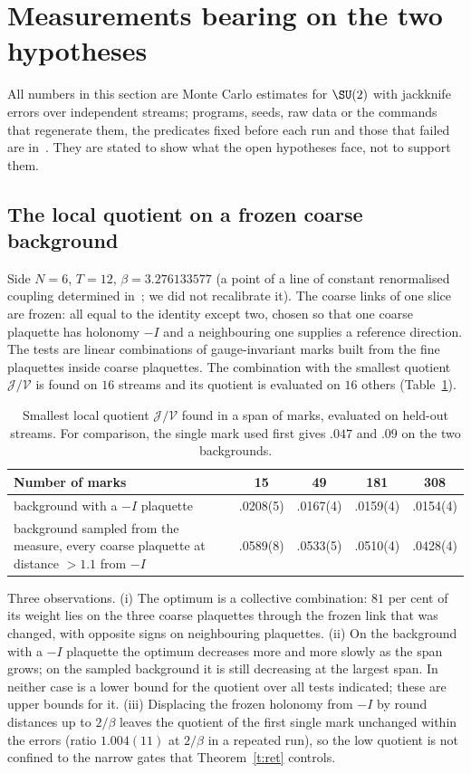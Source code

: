 \section{Measurements bearing on the two hypotheses}\label{s:evid}
All numbers in this section are Monte Carlo estimates for $\SU(2)$ with jackknife errors over independent
streams; programs, seeds, raw data or the commands that regenerate them, the predicates fixed before each run
and those that failed are in~\cite{Repo}. They are stated to show what the open hypotheses face, not to
support them.

\subsection{The local quotient on a frozen coarse background}\label{s:local}
Side $N=6$, $T=12$, $\beta=3.276133577$ (a point of a line of constant renormalised coupling determined
in~\cite{Repo}; we did not recalibrate it). The coarse links of one slice are frozen: all equal to the
identity except two, chosen so that one coarse plaquette has holonomy $-I$ and a neighbouring one supplies a
reference direction. The tests are linear combinations of gauge-invariant marks built from the fine
plaquettes inside coarse plaquettes. The combination with the smallest quotient $\mathcal J/\mathcal V$ is
found on $16$ streams and its quotient is evaluated on $16$ others (Table~\ref{tab:local}).

\begin{table}[ht]
\centering\small
\begin{tabular}{@{}p{}cccc@{}}
\toprule
Number of marks & 15 & 49 & 181 & 308 \\
\midrule
background with a $-I$ plaquette & .0208(5) & .0167(4) & .0159(4) & .0154(4) \\
background sampled from the measure, every coarse plaquette at distance $>1.1$ from $-I$ & .0589(8) & .0533(5) & .0510(4) & .0428(4) \\
\bottomrule
\end{tabular}
\caption{Smallest local quotient $\mathcal J/\mathcal V$ found in a span of marks, evaluated on held-out
streams. For comparison, the single mark used first gives $.047$ and $.09$ on the two backgrounds.}
\label{tab:local}
\end{table}

Three observations. (i) The optimum is a collective combination: $81$ per cent of its weight lies on the three
coarse plaquettes through the frozen link that was changed, with opposite signs on neighbouring plaquettes.
(ii) On the background with a $-I$ plaquette the optimum decreases more and more slowly as the span grows; on
the sampled background it is still decreasing at the largest span. In neither case is a lower bound for the
quotient over all tests indicated; these are upper bounds for it. (iii) Displacing the frozen holonomy from
$-I$ by round distances up to $2/\beta$ leaves the quotient of the first single mark unchanged within the
errors (ratio $1.004(11)$ at $2/\beta$ in a repeated run), so the low quotient is not confined to the narrow
gates that Theorem~\ref{t:ret} controls.

